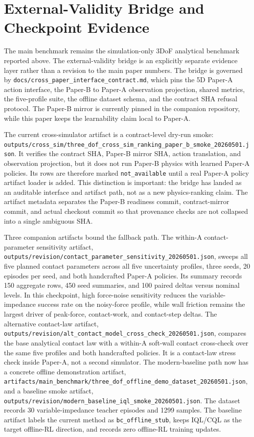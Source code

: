 ﻿\documentclass[11pt]{article}
\newcommand{\code}[1]{\nolinkurl{#1}}
\begin{document}
\section{External-Validity Bridge and Checkpoint Evidence}
\label{sec:external_validity_bridge}

The main benchmark remains the simulation-only 3DoF analytical benchmark reported above. The
external-validity bridge is an explicitly separate evidence layer rather than a revision to the
main paper numbers. The bridge is governed by
\code{docs/cross_paper_interface_contract.md}, which pins the 5D Paper-A action interface, the
Paper-B to Paper-A observation projection, shared metrics, the five-profile suite, the offline
dataset schema, and the contract SHA refusal protocol. The Paper-B mirror is currently pinned in
the companion repository, while this paper keeps the learnability claim local to Paper-A.

The current cross-simulator artifact is a contract-level dry-run smoke:
\code{outputs/cross_sim/three_dof_cross_sim_ranking_paper_b_smoke_20260501.json}. It verifies the
contract SHA, Paper-B mirror SHA, action translation, and observation projection, but it does not
run Paper-B physics with learned Paper-A policies. Its rows are therefore marked
\code{not_available} until a real Paper-A policy artifact loader is added. This distinction is
important: the bridge has landed as an auditable interface and artifact path, not as a new
physics-ranking claim.
The artifact metadata separates the Paper-B readiness commit, contract-mirror commit, and actual
checkout commit so that provenance checks are not collapsed into a single ambiguous SHA.

Three companion artifacts bound the fallback path. The within-A contact-parameter sensitivity
artifact, \code{outputs/revision/contact_parameter_sensitivity_20260501.json}, sweeps all five
planned contact parameters across all five uncertainty profiles, three seeds, 20 episodes per seed,
and both handcrafted Paper-A policies. Its summary records 150 aggregate rows, 450 seed summaries,
and 100 paired deltas versus nominal levels. In this checkpoint, high force-noise sensitivity
reduces the variable-impedance success rate on the noisy-force profile, while wall friction remains
the largest driver of peak-force, contact-work, and contact-step deltas. The alternative contact-law
artifact, \code{outputs/revision/alt_contact_model_cross_check_20260501.json}, compares the base
analytical contact law with a within-A soft-wall contact cross-check over the same five profiles and
both handcrafted policies. It is a contact-law stress check inside Paper-A, not a second simulator.
The modern-baseline path now has a concrete offline demonstration artifact,
\code{artifacts/main_benchmark/three_dof_offline_demo_dataset_20260501.json}, and a baseline smoke
artifact, \code{outputs/revision/modern_baseline_iql_smoke_20260501.json}. The dataset records 30
variable-impedance teacher episodes and 1299 samples. The baseline artifact labels the current
method as \code{bc_offline_stub}, keeps IQL/CQL as the target offline-RL direction, and records zero
offline-RL training updates.
\end{document}
